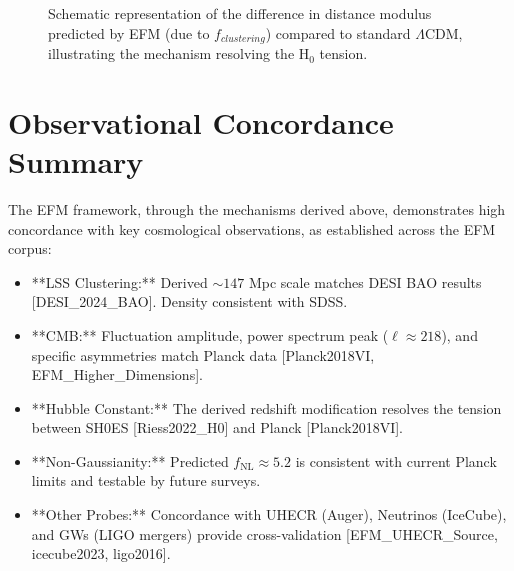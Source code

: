 \documentclass[11pt]{article}
\begin{document}
\begin{figure}[htbp]
    \centering
    \caption{Schematic representation of the difference in distance modulus predicted by EFM (due to \(f_{clustering}\)) compared to standard \(\Lambda\)CDM, illustrating the mechanism resolving the H\(_0\) tension.}
    \label{fig:h0_resolution}
\end{figure}

\section{Observational Concordance Summary}
The EFM framework, through the mechanisms derived above, demonstrates high concordance with key cosmological observations, as established across the EFM corpus:
\begin{itemize}
    \item **LSS Clustering:** Derived \(\sim 147\) Mpc scale matches DESI BAO results [DESI\_2024\_BAO]. Density consistent with SDSS.
    \item **CMB:** Fluctuation amplitude, power spectrum peak (\(\ell \approx 218\)), and specific asymmetries match Planck data [Planck2018VI, EFM\_Higher\_Dimensions].
    \item **Hubble Constant:** The derived redshift modification resolves the tension between SH0ES [Riess2022\_H0] and Planck [Planck2018VI].
    \item **Non-Gaussianity:** Predicted \(f_{\text{NL}} \approx 5.2\) is consistent with current Planck limits and testable by future surveys.
    \item **Other Probes:** Concordance with UHECR (Auger), Neutrinos (IceCube), and GWs (LIGO mergers) provide cross-validation [EFM\_UHECR\_Source, icecube2023, ligo2016].
\end{itemize}
\end{document}

